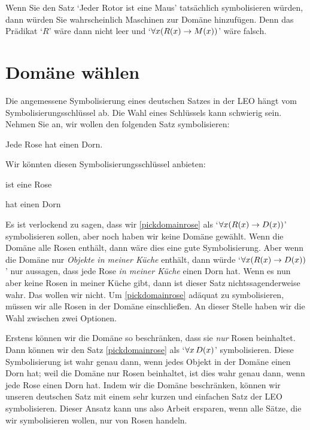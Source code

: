 Wenn Sie den Satz `Jeder Rotor ist eine Maus' tatsächlich symbolisieren würden, dann würden Sie wahrscheinlich Maschinen zur Domäne hinzufügen. Denn das Prädikat `$R$' wäre dann nicht leer und `$\forall x(\mathord{R}(x) \rightarrow \mathord{M}(x))$' wäre falsch.

\section{Domäne wählen}
Die angemessene Symbolisierung eines deutschen Satzes in der LEO hängt vom Symbolisierungsschlüssel ab. Die Wahl eines Schlüssels kann schwierig sein. Nehmen Sie an, wir wollen den folgenden Satz symbolisieren:
	\begin{earg}
		\item[\ex{pickdomainrose}] Jede Rose hat einen Dorn.
	\end{earg}
Wir könnten diesen Symbolisierungsschlüssel anbieten:
	\begin{ekey}
		\item[\atom{R}{x}]  ist eine Rose
		\item[\atom{D}{x}]  hat einen Dorn %
	\end{ekey}
Es ist verlockend zu sagen, dass wir \ref{pickdomainrose} als `$\forall x(\mathord{R}(x) \rightarrow \mathord{D}(x))$' symbolisieren sollen, aber noch haben wir keine Domäne gewählt. Wenn die Domäne alle Rosen enthält, dann wäre dies eine gute Symbolisierung. Aber wenn die Domäne nur \emph{Objekte in meiner Küche} enthält, dann würde `$\forall x(\mathord{R}(x) \rightarrow \mathord{D}(x))$' nur aussagen, dass jede Rose \emph{in meiner Küche} einen Dorn hat. Wenn es nun aber keine Rosen in meiner Küche gibt, dann ist dieser Satz nichtssagenderweise wahr. Das wollen wir nicht. Um \ref{pickdomainrose} adäquat zu symbolisieren, müssen wir alle Rosen in der Domäne einschlie{\ss}en. An dieser Stelle haben wir die Wahl zwischen zwei Optionen. 

Erstens können wir die Domäne so beschränken, dass sie \emph{nur} Rosen beinhaltet. Dann können wir den Satz \ref{pickdomainrose} als `$\forall x\,\mathord{D}(x)$' symbolisieren. Diese Symbolisierung ist wahr genau dann, wenn jedes Objekt in der Domäne einen Dorn hat; weil die Domäne nur Rosen beinhaltet, ist dies wahr genau dann, wenn jede Rose einen Dorn hat. Indem wir die Domäne beschränken, können wir unseren deutschen Satz mit einem sehr kurzen und einfachen Satz der LEO symbolisieren. Dieser Ansatz kann uns also Arbeit ersparen, wenn alle Sätze, die wir symbolisieren wollen, nur von Rosen handeln.

